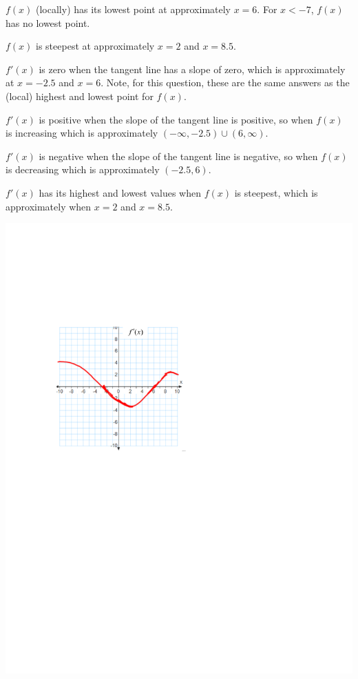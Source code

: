 \documentclass[nooutcomes]{ximera}
\begin{document}
\begin{problem}
\begin{freeResponse}
			$f(x)$ (locally) has its lowest point at approximately $x=6$.  For $x < -7$, $f(x)$ has no lowest point.
			  
			$f(x)$ is steepest at approximately $x=2$ and $x=8.5$.
			   
			$f'(x)$ is zero when the tangent line has a slope of zero, which is approximately at $x=-2.5$ and $x=6$.  Note, for this question, these are the same answers as the 					(local) highest and lowest point for $f(x)$.   
			   
			${f}'(x)$ is positive when the slope of the tangent line is positive, so when $f(x)$ is increasing which is approximately $(-\infty ,-2.5) \cup (6,\infty )$. 
			   
			${f}'(x)$ is negative when the slope of the tangent line is negative, so when $f(x)$is decreasing which is approximately $(-2.5,6)$.
			   
			${f}'(x)$ has its highest and lowest values when $f(x)$ is steepest, which is approximately when $x=2$ and $x = 8.5$. 
			   
			\begin{image}
			\includegraphics[trim= 170 410 250 190]{Figure4.pdf}
			\end{image}

		
		\end{freeResponse}
		
\end{problem}
\end{document}
